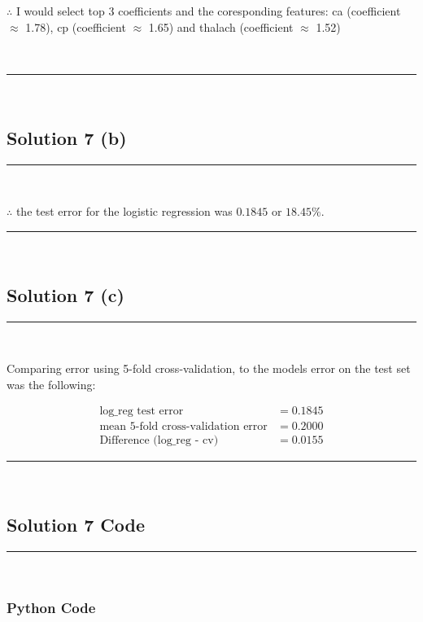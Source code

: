 \documentclass{article}
\begin{document}
\parbox{\textwidth}{
$\therefore$ I would select
top 3 coefficients and the coresponding features: ca (coefficient $\approx$ 1.78), cp (coefficient $\approx$ 1.65) and thalach (coefficient $\approx$ 1.52)
}\\

\noindent\rule{\textwidth}{0.4pt}\\

\newpage

\subsection*{Solution 7 (b)}
\noindent\rule{\textwidth}{0.4pt}\\

\parbox{\textwidth}{
$\therefore$ the test error for the logistic regression was $0.1845$ or $18.45\%$. 
}

\noindent\rule{\textwidth}{0.4pt}\\

\newpage

\subsection*{Solution 7 (c)}
\noindent\rule{\textwidth}{0.4pt}\\

\parbox{\textwidth}{
Comparing error using 5-fold cross-validation, to the models error on the test set was the following:
}
\begin{align*}
  \text{log\_reg test error} &= 0.1845 \\
  \text{mean 5-fold cross-validation error} &= 0.2000 \\
  \text{Difference (log\_reg - cv)} &= 0.0155
\end{align*}

\noindent\rule{\textwidth}{0.4pt}\\

\newpage

\subsection*{Solution 7 Code}
\noindent\rule{\textwidth}{0.4pt}\\

\subsubsection*{Python Code}
\end{document}
